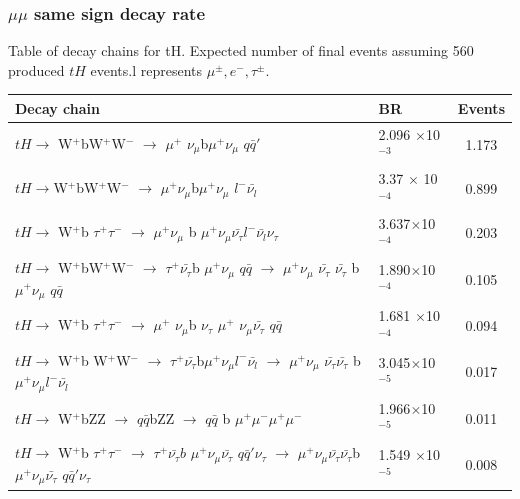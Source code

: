 \documentclass[11pt]{beamer}
\begin{document}
\begin{frame}
\frametitle{$\mu\mu$ same sign decay rate}
\tiny{Table of decay chains for tH.  Expected number of final events assuming 560 produced $tH$ events.l represents $\mu^{\pm},e^- , \tau^\pm$. }
\begin{table}
\renewcommand{\arraystretch}{0.55}
\begin{tabular}{|p{8cm}|p{1.3cm}|c|}
\hline
Decay chain &BR&Events\\
\hline 
\tiny{$tH \rightarrow$ W$^+$bW$^+$W$^-$ $\rightarrow$ $\mu^+$ $\nu_\mu$b$\mu^+\nu_\mu$  $q \bar{q}'$ } &\tiny{2.096 $\times$10$^{-3}$} &  1.173  \\
\hline
\tiny{$tH \rightarrow $W$^+$bW$^+$W$^-$ $\rightarrow$ $\mu^+\nu_\mu$b$\mu^+\nu_\mu$ $l^- \bar{\nu_l}$ } &\tiny{3.37 $\times$ 10$^{-4}$} &0.899 \\
\hline
\tiny{$tH \rightarrow$ W$^+$b $\tau^+ \tau^-$ $\rightarrow$ $\mu^+ \nu_\mu$ b $ \mu^+ \nu_\mu \bar{\nu_\tau} l^-\bar{\nu_l} \nu_\tau$} &\tiny{3.637$\times$10$^{-4}$}&0.203 \\
\hline
\tiny{$tH \rightarrow$ W$^+$bW$^+$W$^-$ $\rightarrow$ $\tau^+ \bar{\nu_\tau}$b $\mu^+ \nu_\mu$  $q\bar{q}$ $\rightarrow$ $\mu^+ \nu_\mu$ $\bar{\nu_\tau}$ $\bar{\nu_\tau}$ b$\mu^+ \nu_\mu$  $q \bar{q}$} &\tiny{1.890$\times$10$^{-4}$}&0.105  \\
\hline
\tiny{$tH \rightarrow$ W$^+$b $\tau^+ \tau^-$ $\rightarrow$ $\mu^+$ $\nu_\mu$b $\nu_\tau$ $\mu^+$ $\nu_\mu \bar{\nu_\tau}$} $q \bar{q}$  &
\tiny{1.681 $\times$10$^{-4}$} & 0.094 \\
\hline
\tiny{$tH \rightarrow$ W$^+$b W$^+$W$^-$ $\rightarrow$ $\tau^+ \bar{\nu_\tau}$b$ \mu^+ \nu_\mu l^- \bar{\nu_l}$ $\rightarrow$ $\mu^+\nu_\mu$ $ \bar{\nu_\tau} \bar{\nu_\tau}$  b$ \mu^+ \nu_\mu l^- \bar{\nu_l}$} &\tiny{3.045$\times$10$^{-5}$}& 0.017\\
\hline
\tiny{$tH \rightarrow$ W$^+$bZZ $\rightarrow$ $q \bar{q}$bZZ $\rightarrow$ $q \bar{q} $ b $\mu^+ \mu^- \mu^+ \mu^-$} & \tiny{1.966$\times$10$^{-5}$} &0.011\\
\hline 
\tiny{$tH \rightarrow$ W$^+$b $\tau^+ \tau^-$ $\rightarrow$ $\tau^+ \bar{\nu_\tau}b$ $\mu^+ \nu_\mu \bar{\nu_\tau} $  $q\bar{q}' \nu_\tau$ $\rightarrow$  $\mu^+ \nu_\mu \bar{\nu_\tau}\bar{\nu_\tau} $b $\mu^+ \nu_\mu \bar{\nu_\tau} $  $q\bar{q}' \nu_\tau$ } &\tiny{1.549 $\times$10$^{-5}$} &  0.008  \\
\hline
\end{tabular}
\end{table}
\end{frame}
\end{document}

